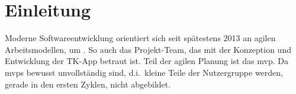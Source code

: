\chapter{Einleitung}
Moderne Softwareentwicklung orientiert sich seit spätestens  2013
an agilen Arbeitsmodellen, um .
So auch das Projekt-Team, das mit der Konzeption und Entwicklung der TK-App
betraut ist. Teil der agilen Planung ist das \gls{mvp}. Da \glspl{mvp} bewusst
unvollständig sind, d.i.\ kleine Teile der Nutzergruppe werden, gerade in den
ersten Zyklen, nicht abgebildet.
